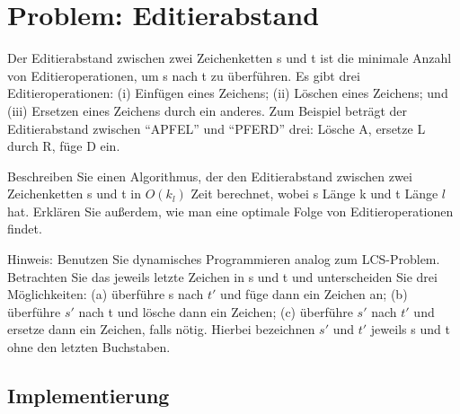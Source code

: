 \section{Problem: Editierabstand}


Der Editierabstand zwischen zwei Zeichenketten s und t ist die minimale Anzahl
von Editieroperationen, um s nach t zu überführen. Es gibt drei Editieroperationen: (i) Einfügen eines Zeichens; (ii) Löschen eines Zeichens; und (iii) Ersetzen eines Zeichens durch ein anderes. Zum Beispiel beträgt der Editierabstand zwischen “APFEL” und “PFERD” drei: Lösche A, ersetze L durch R, füge D ein.

Beschreiben Sie einen Algorithmus, der den Editierabstand zwischen zwei Zeichenketten s und t in $O(k_l)$ Zeit berechnet, wobei s Länge k und t Länge $l$ hat. Erklären Sie außerdem, wie man eine optimale Folge von Editieroperationen findet.

Hinweis: Benutzen Sie dynamisches Programmieren analog zum LCS-Problem. Betrachten Sie das jeweils letzte Zeichen in s und t und unterscheiden Sie drei Möglichkeiten: (a) überführe s nach $t'$ und füge dann ein Zeichen an; (b) überführe $s'$ nach t
und lösche dann ein Zeichen; (c) überführe $s'$ nach $t'$ und ersetze dann ein Zeichen, falls nötig. Hierbei bezeichnen $s'$ und $t'$ jeweils s und t ohne den letzten Buchstaben.

\subsection{Implementierung}

